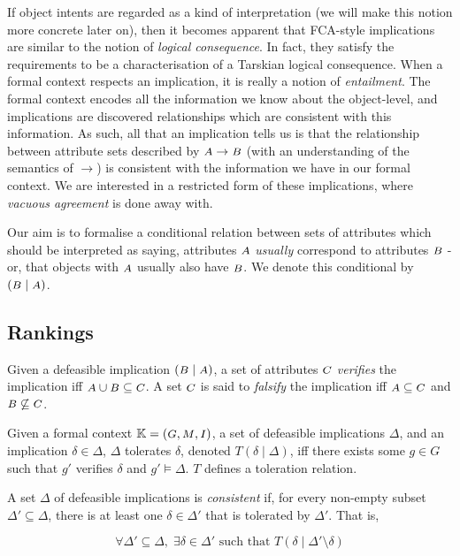 If object intents are regarded as a kind of interpretation (we will make this notion more concrete later on), then it becomes apparent that FCA-style implications are similar to the notion of \textit{logical consequence}. In fact, they satisfy the requirements to be a characterisation of a Tarskian logical consequence. \cite{Kaliski:2020} When a formal context respects an implication, it is really a notion of \textit{entailment}. The formal context encodes all the information we know about the object-level, and implications are discovered relationships which are consistent with this information. As such, all that an implication tells us is that the relationship between attribute sets described by $\A \rightarrow \B$ (with an understanding of the semantics of $\rightarrow$) is consistent with the information we have in our formal context. We are interested in a restricted form of these implications, where \textit{vacuous agreement} is done away with.

Our aim is to formalise a conditional relation between sets of attributes which should be interpreted as saying, attributes $\A$ \textit{usually} correspond to attributes $\B$ - or, that objects with $\A$ usually also have $\B$. We denote this conditional by $(\B \mid \A)$.
%
\subsection{Rankings}
\label{subsec: Ranking}
%
\begin{definition}
    \label{definition—verifies—fca}
    Given a defeasible implication $(\B \mid \A)$, a set of attributes $\C$ \emph{verifies} the implication iff $\A \cup \B \subseteq \C$. A set $\C$ is said to \textit{falsify} the implication iff $\A \subseteq \C$ and $\B \not\subseteq \C$.
\end{definition}
%
\begin{definition}
    \label{definition—tolerates—fca}
    Given a formal context $\FC$, a set of defeasible implications $\Delta$, and an implication $\delta \in \Delta$, $\Delta$ tolerates $\delta$, denoted $T(\delta \mid \Delta)$, iff there exists some $g \in G$ such that $g'$ verifies $\delta$ and $g' \models \Delta$. $T$ defines a toleration relation.
\end{definition}
%
\begin{definition}
    \label{definition—consistent—fca}
    A set $\Delta$ of defeasible implications is \emph{consistent} if, for every non-empty subset $\Delta' \subseteq \Delta$, there is at least one $\delta \in \Delta'$ that is tolerated by $\Delta'$. That is,

    \[\forall \Delta' \subseteq \Delta,\; \exists \delta \in \Delta' \text{ such that } T(\delta \mid \Delta'\setminus \delta) \]
\end{definition}
%
